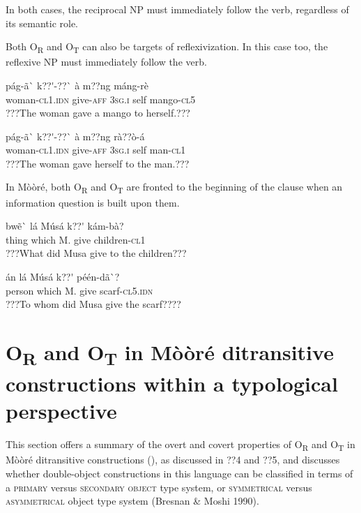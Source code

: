 \documentclass[output=paper]{langsci/langscibook}
\begin{document}
In both cases, the reciprocal NP must immediately follow the verb, regardless of its semantic role. 

Both O\textsubscript{R }and O\textsubscript{T} can also be targets of reflexivization. In this case too, the reflexive NP must immediately follow the verb.


\ea \gll 
pág-ã\`{ }      k??\'{ }-??\`{ }    à    m??ng  máng-rè
\\
%
woman-\textsc{cl1.idn}  give-\textsc{aff}  \textsc{3sg.i  }  self  mango-\textsc{cl5}
\\\glt
???The woman gave a mango to herself.???
\z


\ea \gll 
pág-ã\`{ }      k??\'{ }-??\`{ }        à    m??ng  rà??ò-á
\\
%
woman-\textsc{cl1.idn}  give-\textsc{aff}  \textsc{3sg.i  }  self  man-\textsc{cl1}
\\\glt
???The woman gave herself to the man.???
\z


In Mòòré, both O\textsubscript{R} and O\textsubscript{T} are fronted to the beginning of the clause when an information question is built upon them. 


\ea \gll 
bwẽ\`{ }    lá    Músá  k??\'{ }  kám-bà?
\\
%
thing    which    M.  give  children-\textsc{cl1}
\\\glt
???What did Musa give to the children???
\z


\ea \gll 
án    lá    Músá  k??\'{ }  péén-dã\`{ }?
\\
%
person  which    M.  give  scarf-\textsc{cl5.idn}
\\\glt
???To whom did Musa give the scarf????
\z

\section{O\textsubscript{R} and O\textsubscript{T} in Mòòré ditransitive constructions within a typological perspective}

This section offers a summary of the overt and covert properties of O\textsubscript{R} and O\textsubscript{T} in Mòòré ditransitive constructions (), as discussed in ??4 and ??5, and discusses whether double-object constructions in this language can be classified in terms of a \textsc{primary} versus \textsc{secondary object }\citep{Dryer1986} type system, or \textsc{symmetrical} versus \textsc{asymmetrical} object type system (Bresnan \& Moshi 1990).
\end{document}
